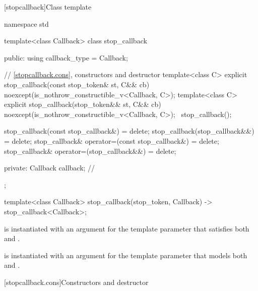 %
[stopcallback]{Class template }

\pnum
{}%
\begin{codeblock}
namespace std {
  template<class Callback>
  class stop_callback {
  public:
    using callback_type = Callback;

    // \ref{stopcallback.cons}, constructors and destructor
    template<class C>
      explicit stop_callback(const stop_token& st, C&& cb)
        noexcept(is_nothrow_constructible_v<Callback, C>);
    template<class C>
      explicit stop_callback(stop_token&& st, C&& cb)
        noexcept(is_nothrow_constructible_v<Callback, C>);
    ~stop_callback();

    stop_callback(const stop_callback&) = delete;
    stop_callback(stop_callback&&) = delete;
    stop_callback& operator=(const stop_callback&) = delete;
    stop_callback& operator=(stop_callback&&) = delete;

  private:
    Callback callback;      // \expos
  };

  template<class Callback>
    stop_callback(stop_token, Callback) -> stop_callback<Callback>;
}
\end{codeblock}

\pnum
\mandates
{} is instantiated with an argument for the
template parameter 
that satisfies both 
and .

\pnum
\expects
{} is instantiated with an argument for the
template parameter 
that models both 
and .


[stopcallback.cons]{Constructors and destructor}

